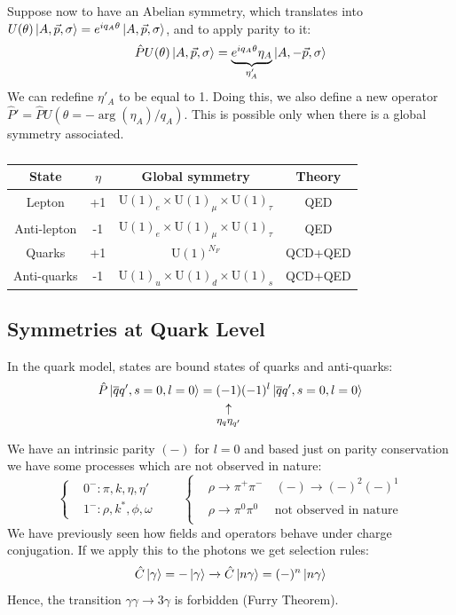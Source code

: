 \documentclass[../main.tex]{subfiles}
\begin{document}
Suppose now to have an Abelian symmetry, which translates into $U(\theta)\ket{A,\Vec{p},\sigma}=e^{iq_A\theta}\ket{A,\Vec{p},\sigma}$, and to apply parity to it:
\[
\hat{P}U(\theta)\ket{A,\Vec{p},\sigma}=\underbrace{e^{iq_A\theta}\eta_A}_{\eta'_A}\ket{A,-\Vec{p},\sigma}
\]
We can redefine $\eta'_A$ to be equal to 1. Doing this, we also define a new operator $\hat{P}'=\hat{P}U(\theta=-\arg(\eta_A)/q_A)$. This is possible only when there is a global symmetry associated.
\begin{table}[h]
    \centering
    \begin{tabular}{c|c|c|c}
    \rowcolor{gray!45}State & $\eta$ & Global symmetry & Theory\\
    \hline
    Lepton & +1 & U$(1)_e\times$U$(1)_\mu\times$U$(1)_\tau$ & QED\\
    Anti-lepton & -1 & U$(1)_e\times$U$(1)_\mu\times$U$(1)_\tau$ & QED\\
    Quarks & +1 & U$(1)^{N_F}$ & QCD+QED\\
    Anti-quarks & -1 & U$(1)_u\times$U$(1)_d\times$U$(1)_s$ & QCD+QED\\
    \hline
    \end{tabular}
    \caption*{}
\end{table}
\subsection{Symmetries at Quark Level}
In the quark model, states are bound states of quarks and anti-quarks:
\[
\hat{P}\ket{\overline{q}q',s=0,l=0}=\underset{\mathclap{\tikz \node {$\uparrow$} node [below=1ex] {\footnotesize  $\eta_q\eta_{q'}$};}}{(-1)}(-1)^l\ket{\overline{q}q',s=0,l=0}
\]
We have an intrinsic parity $(-)$ for $l=0$ and based just on parity conservation we have some processes which are not observed in nature:
\[
\left\{
\begin{aligned}
&0^-: \pi,k,\eta,\eta'\\
&1^-: \rho,k^*,\phi,\omega
\end{aligned}
\right.
\qquad
\left\{
\begin{aligned}
&\rho\xrightarrow[]{}\pi^+\pi^- \quad (-)\xrightarrow[]{}(-)^2(-)^1\\
&\rho\xrightarrow[]{}\pi^0\pi^0 \quad \text{ not observed in nature}
\end{aligned}
\right.
\]
We have previously seen how fields and operators behave under charge conjugation. If we apply this to the photons we get selection rules:
\[
\hat{C}\ket{\gamma}=-\ket{\gamma}\xrightarrow[]{}\hat{C}\ket{n\gamma}=(-)^n\ket{n\gamma}
\]
Hence, the transition $\gamma\gamma\xrightarrow[]{}3\gamma$ is forbidden (Furry Theorem).
\end{document}
